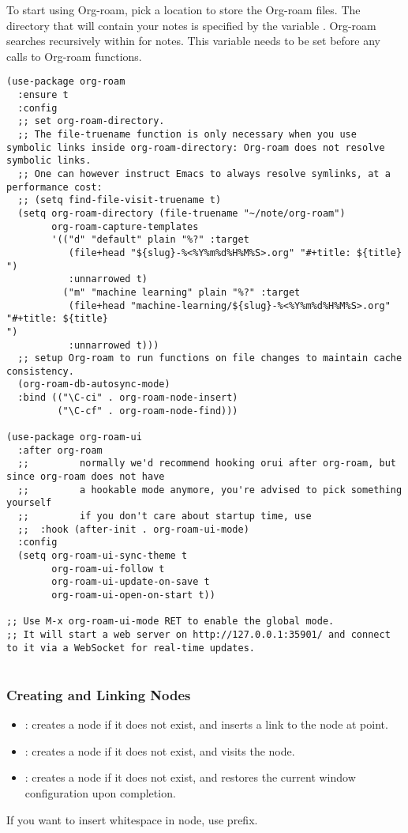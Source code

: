 To start using Org-roam, pick a location to store the Org-roam files.
The directory that will contain your notes is specified by the variable .
Org-roam searches recursively within  for notes.
This variable needs to be set before any calls to Org-roam functions.

\begin{lstlisting}
(use-package org-roam
  :ensure t
  :config
  ;; set org-roam-directory.
  ;; The file-truename function is only necessary when you use symbolic links inside org-roam-directory: Org-roam does not resolve symbolic links.
  ;; One can however instruct Emacs to always resolve symlinks, at a performance cost:
  ;; (setq find-file-visit-truename t)
  (setq org-roam-directory (file-truename "~/note/org-roam")
        org-roam-capture-templates
        '(("d" "default" plain "%?" :target
           (file+head "${slug}-%<%Y%m%d%H%M%S>.org" "#+title: ${title}
")
           :unnarrowed t)
          ("m" "machine learning" plain "%?" :target
           (file+head "machine-learning/${slug}-%<%Y%m%d%H%M%S>.org" "#+title: ${title}
")
           :unnarrowed t)))
  ;; setup Org-roam to run functions on file changes to maintain cache consistency.   
  (org-roam-db-autosync-mode)
  :bind (("\C-ci" . org-roam-node-insert)
         ("\C-cf" . org-roam-node-find)))

(use-package org-roam-ui
  :after org-roam
  ;;         normally we'd recommend hooking orui after org-roam, but since org-roam does not have
  ;;         a hookable mode anymore, you're advised to pick something yourself
  ;;         if you don't care about startup time, use
  ;;  :hook (after-init . org-roam-ui-mode)
  :config
  (setq org-roam-ui-sync-theme t
        org-roam-ui-follow t
        org-roam-ui-update-on-save t
        org-roam-ui-open-on-start t))

;; Use M-x org-roam-ui-mode RET to enable the global mode.
;; It will start a web server on http://127.0.0.1:35901/ and connect to it via a WebSocket for real-time updates.


\end{lstlisting}






\subsubsection{Creating and Linking Nodes}
\label{sec:creat-link-nodes}

\begin{itemize}
\item {}: creates a node if it does not exist, and inserts a link to the node at point.
\item {}: creates a node if it does not exist, and visits the node.
\item {}: creates a node if it does not exist, and restores the current window configuration upon completion.
\end{itemize}

If you want to insert whitespace in node, use  prefix.


